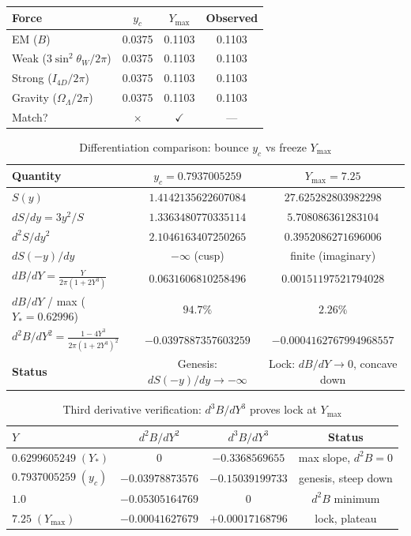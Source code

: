\documentclass[a4paper,1pt,oneside,openany]{book}
\begin{document}
\begin{table}[h]
\centering
\begin{tabular}{@{}lccc@{}}
\toprule
Force & $y_c$ & $Y_{\max}$ & Observed \\
\midrule
EM ($B$) & 0.0375 & 0.1103 & 0.1103 \\
Weak ($3\sin^2\theta_W/2\pi$) & 0.0375 & 0.1103 & 0.1103 \\
Strong ($I_{4D}/2\pi$) & 0.0375 & 0.1103 & 0.1103 \\
Gravity ($\Omega_\Lambda/2\pi$) & 0.0375 & 0.1103 & 0.1103 \\
\midrule
Match? & $\times$ & $\checkmark$ & --- \\
\bottomrule
\end{tabular}
\end{table}
\begin{table}[h]
\centering
\caption{Differentiation comparison: bounce $y_c$ vs freeze $Y_{\max}$}
\label{tab:diff-bounce-freeze}
\small
\begin{tabular}{@{}lcc@{}}
\toprule
\textbf{Quantity} & \textbf{$y_c=0.7937005259$} & \textbf{$Y_{\max}=7.25$} \\
\midrule
$S(y)$ & $1.4142135622607084$ & $27.625282803982298$ \\
$dS/dy = 3y^2/S$ & $1.3363480770335114$ & $5.708086361283104$ \\
$d^2S/dy^2$ & $2.1046163407250265$ & $0.3952086271696006$ \\
$dS(-y)/dy$ & $-\infty$ (cusp) & finite (imaginary) \\
\midrule
$dB/dY = \frac{Y}{2\pi(1+2Y^3)}$ & $0.0631606810258496$ & $0.00151197521794028$ \\
$dB/dY$ / max ($Y_*=0.62996$) & $94.7\%$ & $2.26\%$ \\
$d^2B/dY^2 = \frac{1-4Y^3}{2\pi(1+2Y^3)^2}$ & $-0.0397887357603259$ & $-0.0004162767994968557$ \\
\midrule
\textbf{Status} & Genesis: $dS(-y)/dy\to-\infty$ & Lock: $dB/dY\to0$, concave down \\
\bottomrule
\end{tabular}
\end{table}
\begin{table}[h]
\centering
\caption{Third derivative verification: $d^3B/dY^3$ proves lock at $Y_{\max}$}
\label{tab:d3B-verified}
\small
\begin{tabular}{@{}lccc@{}}
\toprule
$Y$ & $d^2B/dY^2$ & $d^3B/dY^3$ & Status \\
\midrule
$0.6299605249\;(Y_*)$ & $0$ & $-0.3368569655$ & max slope, $d^2B=0$ \\
$0.7937005259\;(y_c)$ & $-0.03978873576$ & $-0.15039199733$ & genesis, steep down \\
$1.0$ & $\mathbf{-0.05305164769}$ & $0$ & $d^2B$ minimum \\
$7.25\;(Y_{\max})$ & $-0.00041627679$ & $+0.00017168796$ & lock, plateau \\
\bottomrule
\end{tabular}
\end{table}
\end{document}
